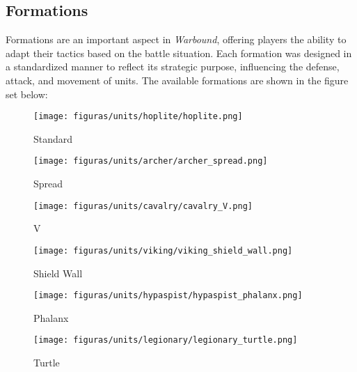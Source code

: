 \subsection{Formations}

Formations are an important aspect in \textit{Warbound}, offering players the ability to adapt their tactics based on the battle situation. Each formation was designed in a standardized manner to reflect its strategic purpose, influencing the defense, attack, and movement of units. The available formations are shown in the figure set below:

\begin{figure}[H]
    \centering
    \begin{minipage}{0.1\textwidth}
        \centering
        \texttt{[image: figuras/units/hoplite/hoplite.png]}
        \caption{Standard}
    \end{minipage}\hspace{0.03\textwidth}
    \begin{minipage}{0.12\textwidth}
        \centering
        \texttt{[image: figuras/units/archer/archer\_spread.png]}
        \caption{Spread}
    \end{minipage}\hspace{0.03\textwidth}
    \begin{minipage}{0.12\textwidth}
        \centering
        \texttt{[image: figuras/units/cavalry/cavalry\_V.png]}
        \caption{V}
    \end{minipage}\hspace{0.03\textwidth}
    \begin{minipage}{0.12\textwidth}
        \centering
        \texttt{[image: figuras/units/viking/viking\_shield\_wall.png]}
        \caption{Shield Wall}
    \end{minipage}\hspace{0.03\textwidth}
    \begin{minipage}{0.12\textwidth}
        \centering
        \texttt{[image: figuras/units/hypaspist/hypaspist\_phalanx.png]}
        \caption{Phalanx}
    \end{minipage}\hspace{0.03\textwidth}
    \begin{minipage}{0.12\textwidth}
        \centering
        \texttt{[image: figuras/units/legionary/legionary\_turtle.png]}
        \caption{Turtle}
    \end{minipage}
\end{figure}

